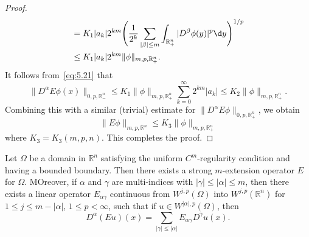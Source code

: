\begin{proof}
\begin{align*}
    & = K_1 |a_k| 2^{km} \Biggl(\frac{1}{2^k} \sum_{|\beta|\leq m}
        \int_{\mathbb{R}^n_+} |D^\beta \phi(y)|^p \d y\Biggr)^{1/p} \\
    & \leq K_1 |a_k| 2^{km} \|\phi\|_{m,p,\mathbb{R}^n_+}.
  \end{align*}
  It follows from~\eqref{eq:5.21} that
  \[ \|D^\alpha E\phi(x)\|_{0,p,\mathbb{R}^n_-}
      \leq K_1 \|\phi\|_{m,p,\mathbb{R}^n_+} \sum_{k=0}^\infty 2^{km} |a_k|
      \leq K_2 \|\phi\|_{m,p,\mathbb{R}^n_+}. \]
  Combining this with a similar (trivial) estimate 
  for $\|D^\alpha E\phi\|_{0,p,\mathbb{R}^n_+}$,
  we obtain
  \[ \|E\phi\|_{m,p,\mathbb{R}^n} \leq K_3 \|\phi\|_{m,p,\mathbb{R}^n_+} \]
  where $K_3 = K_3(m,p,n)$. This completes the proof.
\end{proof}


\begin{theorem}
  Let $\Omega$ be a domain in $\mathbb{R}^n$ satisfying the uniform
  $C^m$-regularity condition and having a bounded boundary. Then there
  exists a strong $m$-extension operator $E$ for $\Omega$. MOreover,
  if $\alpha$ and $\gamma$ are multi-indices with $|\gamma|\leq |\alpha|\leq m$,
  then there exists a linear operator $E_{\alpha\gamma}$ continuous
  from $W^{j,p}(\Omega)$ into $W^{j,p}(\mathbb{R}^n)$ for
  $1\leq j\leq m-|\alpha|$, $1\leq p<\infty$, such that if
  $u\in W^{|\alpha|,p}(\Omega)$, then
  \begin{equation}\label{eq:5.23}
    D^\alpha (Eu)(x) = \sum_{|\gamma|\leq |\alpha|} E_{\alpha\gamma} D^\gamma u(x).
  \end{equation}
\end{theorem}

